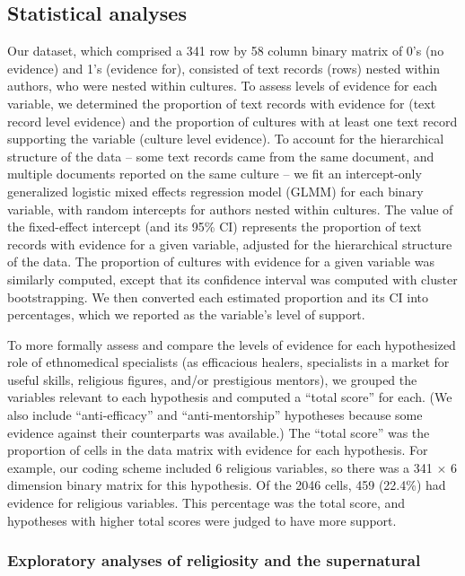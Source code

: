 \documentclass[
]{article}
\begin{document}
\hypertarget{statistical-analyses}{%
\subsection{Statistical analyses}\label{statistical-analyses}}

Our dataset, which comprised a 341 row by 58 column binary matrix of 0's (no evidence) and 1's (evidence for), consisted of text records (rows) nested within authors, who were nested within cultures. To assess levels of evidence for each variable, we determined the proportion of text records with evidence for (text record level evidence) and the proportion of cultures with at least one text record supporting the variable (culture level evidence). To account for the hierarchical structure of the data -- some text records came from the same document, and multiple documents reported on the same culture -- we fit an intercept-only generalized logistic mixed effects regression model (GLMM) for each binary variable, with random intercepts for authors nested within cultures. The value of the fixed-effect intercept (and its 95\% CI) represents the proportion of text records with evidence for a given variable, adjusted for the hierarchical structure of the data. The proportion of cultures with evidence for a given variable was similarly computed, except that its confidence interval was computed with cluster bootstrapping. We then converted each estimated proportion and its CI into percentages, which we reported as the variable's level of support.

To more formally assess and compare the levels of evidence for each hypothesized role of ethnomedical specialists (as efficacious healers, specialists in a market for useful skills, religious figures, and/or prestigious mentors), we grouped the variables relevant to each hypothesis and computed a ``total score'' for each. (We also include ``anti-efficacy'' and ``anti-mentorship'' hypotheses because some evidence against their counterparts was available.) The ``total score'' was the proportion of cells in the data matrix with evidence for each hypothesis. For example, our coding scheme included 6 religious variables, so there was a 341 \(\times\) 6 dimension binary matrix for this hypothesis. Of the 2046 cells, 459 (22.4\%) had evidence for religious variables. This percentage was the total score, and hypotheses with higher total scores were judged to have more support.

\hypertarget{exploratory-analyses-of-religiosity-and-the-supernatural}{%
\subsubsection{Exploratory analyses of religiosity and the supernatural}\label{exploratory-analyses-of-religiosity-and-the-supernatural}}
\end{document}
